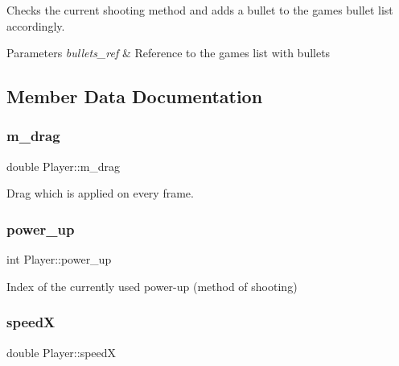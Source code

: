 Checks the current shooting method and adds a bullet to the game\textquotesingle{}s bullet list accordingly.


\begin{DoxyParams}{Parameters}
{\em bullets\+\_\+ref} & Reference to the game\textquotesingle{}s list with bullets \\
\hline
\end{DoxyParams}


\subsection{Member Data Documentation}
\mbox{\label{classPlayer_ae60c030f7922b4c385af29e04c040ccc}} 
\subsubsection{\texorpdfstring{m\+\_\+drag}{m\_drag}}
{\footnotesize\ttfamily double Player\+::m\+\_\+drag\hspace{0.3cm}{\ttfamily [private]}}



Drag which is applied on every frame. 

\mbox{\label{classPlayer_ad7c3f7dc92bc22846e2af9c29eadc3c7}} 
\subsubsection{\texorpdfstring{power\+\_\+up}{power\_up}}
{\footnotesize\ttfamily int Player\+::power\+\_\+up\hspace{0.3cm}{\ttfamily [private]}}



Index of the currently used power-\/up (method of shooting) 

\mbox{\label{classPlayer_ad688128863db33f5e527d7e434f557d7}} 
\subsubsection{\texorpdfstring{speedX}{speedX}}
{\footnotesize\ttfamily double Player\+::speedX}



